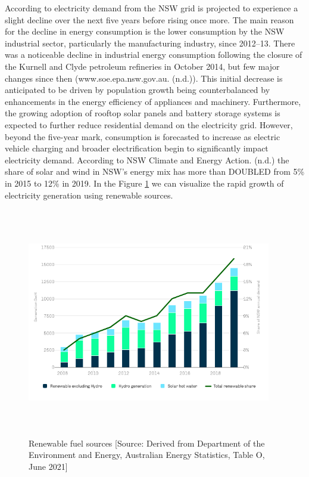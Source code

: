 \documentclass[mstat,12pt]{unswthesis}
\begin{document}
According to \cite{nsw_epa_2021_energy_consumption} electricity demand
from the NSW grid is projected to experience a slight decline over the
next five years before rising once more. The main reason for the decline
in energy consumption is the lower consumption by the NSW industrial
sector, particularly the manufacturing industry, since 2012--13. There
was a noticeable decline in industrial energy consumption following the
closure of the Kurnell and Clyde petroleum refineries in October 2014,
but few major changes since then (www.soe.epa.nsw.gov.au. (n.d.)). This
initial decrease is anticipated to be driven by population growth being
counterbalanced by enhancements in the energy efficiency of appliances
and machinery. Furthermore, the growing adoption of rooftop solar panels
and battery storage systems is expected to further reduce residential
demand on the electricity grid. However, beyond the five-year mark,
consumption is forecasted to increase as electric vehicle charging and
broader electrification begin to significantly impact electricity
demand. According to NSW Climate and Energy Action. (n.d.) the share of
solar and wind in NSW's energy mix has more than DOUBLED from 5\% in
2015 to 12\% in 2019. In the Figure \ref{renewable} we can visualize the
rapid growth of electricity generation using renewable sources.

\begin{figure}[H]
\centering
\includegraphics[width=0.95\textwidth,height=10cm]{renewable_fuel_sources_chart.png}
\caption{Renewable fuel sources [Source:
Derived from Department of the Environment and Energy, Australian Energy Statistics, Table O, June 2021]}\label{renewable}
\end{figure}
\end{document}
